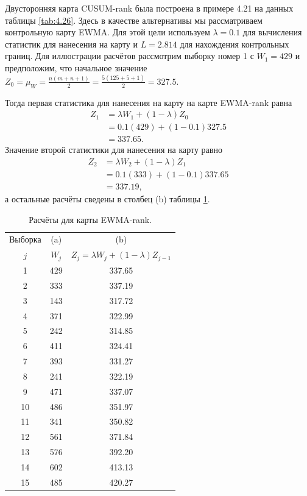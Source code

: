 Двусторонняя карта CUSUM-rank была построена в примере 4.21 на данных таблицы \ref{tab:4.26}. Здесь в качестве альтернативы мы рассматриваем контрольную карту EWMA. Для этой цели используем \(\lambda = 0.1\) для вычисления статистик для нанесения на карту и \(L = 2.814\) для нахождения контрольных границ. Для иллюстрации расчётов рассмотрим выборку номер 1 с \(W_1 = 429\) и предположим, что начальное значение \(Z_0 = \mu_W = \frac{n(m + n + 1)}{2} = \frac{5(125 + 5 + 1)}{2} = 327.5\).

Тогда первая статистика для нанесения на карту на карте EWMA-rank равна
\begin{align*}
	Z_1 &= \lambda W_1 + (1 - \lambda)Z_0 \\
	    &= 0.1(429) + (1 - 0.1)327.5 \\
	    &= 337.65.
\end{align*}
Значение второй статистики для нанесения на карту равно
\begin{align*}
	Z_2 &= \lambda W_2 + (1 - \lambda)Z_1 \\
	    &= 0.1(333) + (1 - 0.1)337.65 \\
	    &= 337.19,
\end{align*}
а остальные расчёты сведены в столбец (b) таблицы \ref{tab:4.28}.

\begin{table}[!ht]
	\centering
	\caption{Расчёты для карты EWMA-rank.}
	\label{tab:4.28}
	\small
	\begin{tabular}{@{}ccc@{}}
		\toprule
		Выборка & (a) & (b) \\
		\(j\) & \(W_j\) & \(Z_j = \lambda W_j + (1 - \lambda)Z_{j-1}\) \\
		\midrule
		1 & 429 & 337.65 \\
		2 & 333 & 337.19 \\
		3 & 143 & 317.72 \\
		4 & 371 & 322.99 \\
		5 & 242 & 314.85 \\
		6 & 411 & 324.41 \\
		7 & 393 & 331.27 \\
		8 & 241 & 322.19 \\
		9 & 471 & 337.07 \\
		10 & 486 & 351.97 \\
		11 & 341 & 350.82 \\
		12 & 561 & 371.84 \\
		13 & 576 & 392.20 \\
		14 & 602 & 413.13 \\
		15 & 485 & 420.27 \\
		\bottomrule
	\end{tabular}
\end{table}

